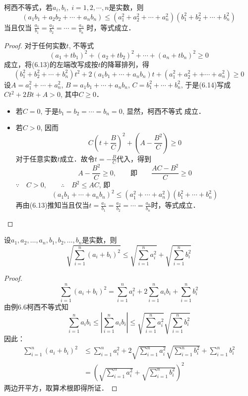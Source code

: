 \begin{example}
    柯西不等式，若$a_i,b_i,\; i=1,2,\cdots ,n$是实数，则
\[(a_1b_1+a_2b_2+\cdots +a_nb_n)\le (a_1^2+a_2^2+\cdots +a_n^2)(b_1^2+b_2^2+\cdots+b_n^2)\]
当且仅当
$\frac{a_1}{b_1}=\frac{a_2}{b_2}=\cdots=\frac{a_n}{b_n}$
时，等式成立．
\end{example}

\begin{proof}
对于任何实数$t$, 不等式
\begin{equation}
    (a_1+tb_1)^2+(a_2+tb_2)^2+\cdots +(a_n+tb_n)^2\ge 0
\end{equation}
成立，将(6.13)的左端改写成按$t$的降幂排列，得
\begin{equation}
   ( b^2_1+b^2_2+\cdots +b^2_n)t^2+2(a_1b_1+\cdots +a_nb_n)t+(a^2_1+a_2^2+
+\cdots +a_n^2)\ge 0
\end{equation} 
设$A=a^2_1+\cdots +a_n^2$, $B=a_1b_1+\cdots +a_nb_n$,
$C=b^2_1+\cdots +b^2_n$, 
于是(6.14)写成
$Ct^2+2Bt+A>0$, 其中$C\ge 0$．
\begin{itemize}
    \item 若$C=0$, 于是$b_1=b_2=\cdots =b_n=0$, 显然，柯西不等式
成立．
\item 若$C>0$, 因而$$C\left(t+\frac{B}{C}\right)^2+\left(A-\frac{B^2}{C}\right)\ge 0$$
对于任意实数$t$成立．故令$t=-\frac{B}{C}$代入，得到
\[A-\frac{B^2}{C}\ge 0,\qquad \text{即}\qquad \frac{AC-B^2}{C}\ge 0\]
$\because\quad C>0,\qquad \therefore\quad B^2\le AC$, 即
\[(a_1b_1+\cdots +a_nb_n)^2\le (a^2_1+\cdots +a^2_n)(b^2_1+\cdots +b^2_n)\]
再由(6.13)推知当且仅当$t=\frac{a_1}{b_1}=\frac{a_2}{b_2}=\cdots=\frac{a_n}{b_n}$时，等式成立．
\end{itemize}
\end{proof}

\begin{example}
    设$a_1,a_2,\ldots,a_n,b_1,b_2,\ldots,b_n$是实数，则
\[\sqrt{\sum^n_{i=1}(a_i+b_i)^2}\le \sqrt{\sum^n_{i=1}a^2_i}+\sqrt{\sum^n_{i=1}b^2_i}\]
\end{example}

\begin{proof}
 \[   \sum^n_{i=1}(a_i+b_i)^2=\sum^n_{i=1}a_i^2+2\sum^n_{i=1}a_ib_i+\sum^n_{i=1}b_i^2\]
由例6.6柯西不等式知
\[\sum^n_{i=1}a_ib_i\le\left|\sum^n_{i=1}a_ib_i\right|\le \sqrt{\sum^n_{i=1}a_i^2}\sqrt{\sum^n_{i=1}b_i^2}\]
因此：
\[\begin{split}
    \sum^n_{i=1}(a_i+b_i)^2&\le \sum^n_{i=1}a_i^2+2\sqrt{\sum^n_{i=1}a_i^2}\sqrt{\sum^n_{i=1}b_i^2}+\sum^n_{i=1}b_i^2\\
    &=\left(\sqrt{\sum^n_{i=1}a^2_i}+\sqrt{\sum^n_{i=1}b^2_i}\right)^2
\end{split}\]
两边开平方，取算术根即得所证．
\end{proof}    

